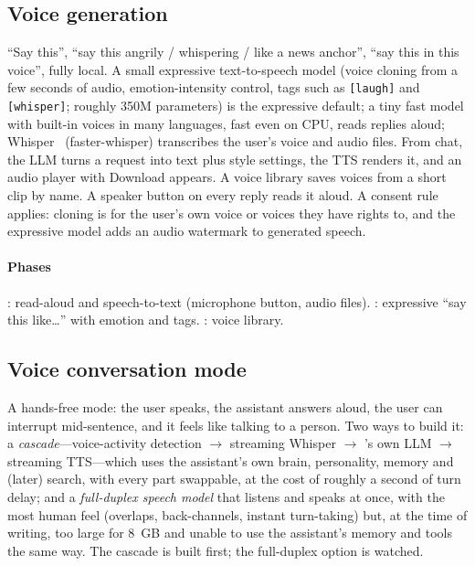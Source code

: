 \subsection{Voice generation}

``Say this'', ``say this angrily / whispering / like a news anchor'', ``say this in this voice'', fully local. A small expressive text-to-speech model (voice cloning from a few seconds of audio, emotion-intensity control, tags such as \texttt{[laugh]} and \texttt{[whisper]}; roughly 350M parameters) is the expressive default; a tiny fast model with built-in voices in many languages, fast even on CPU, reads replies aloud; Whisper~\cite{whisper} (faster-whisper) transcribes the user's voice and audio files. From chat, the LLM turns a request into text plus style settings, the TTS renders it, and an audio player with Download appears. A voice library saves voices from a short clip by name. A speaker button on every reply reads it aloud. A consent rule applies: cloning is for the user's own voice or voices they have rights to, and the expressive model adds an audio watermark to generated speech.

\paragraph{Phases} : read-aloud and speech-to-text (microphone button, audio files). : expressive ``say this like\dots'' with emotion and tags. : voice library.

\subsection{Voice conversation mode}

A hands-free mode: the user speaks, the assistant answers aloud, the user can interrupt mid-sentence, and it feels like talking to a person. Two ways to build it: a \emph{cascade}---voice-activity detection $\rightarrow$ streaming Whisper $\rightarrow$ \hivi{}'s own LLM $\rightarrow$ streaming TTS---which uses the assistant's own brain, personality, memory and (later) search, with every part swappable, at the cost of roughly a second of turn delay; and a \emph{full-duplex speech model} that listens and speaks at once, with the most human feel (overlaps, back-channels, instant turn-taking) but, at the time of writing, too large for 8~GB and unable to use the assistant's memory and tools the same way. The cascade is built first; the full-duplex option is watched.

